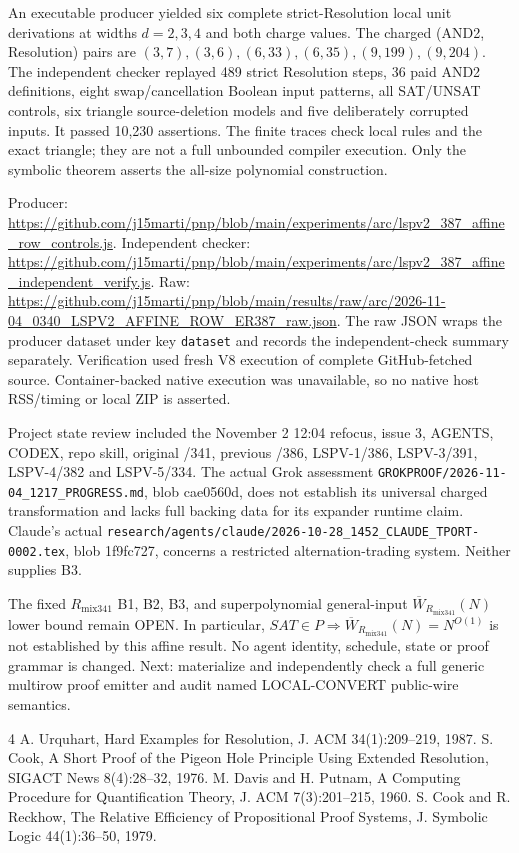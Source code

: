\documentclass[11pt]{article}
\begin{document}
An executable producer yielded six complete strict-Resolution local unit derivations at widths $d=2,3,4$ and both charge values. The charged (AND2, Resolution) pairs are $(3,7),(3,6),(6,33),(6,35),(9,199),(9,204)$. The independent checker replayed 489 strict Resolution steps, 36 paid AND2 definitions, eight swap/cancellation Boolean input patterns, all SAT/UNSAT controls, six triangle source-deletion models and five deliberately corrupted inputs. It passed 10,230 assertions. The finite traces check local rules and the exact triangle; they are not a full unbounded compiler execution. Only the symbolic theorem asserts the all-size polynomial construction.

Producer: \url{https://github.com/j15marti/pnp/blob/main/experiments/arc/lspv2_387_affine_row_controls.js}.
Independent checker: \url{https://github.com/j15marti/pnp/blob/main/experiments/arc/lspv2_387_affine_independent_verify.js}.
Raw: \url{https://github.com/j15marti/pnp/blob/main/results/raw/arc/2026-11-04_0340_LSPV2_AFFINE_ROW_ER387_raw.json}.
The raw JSON wraps the producer dataset under key \texttt{dataset} and records the independent-check summary separately. Verification used fresh V8 execution of complete GitHub-fetched source. Container-backed native execution was unavailable, so no native host RSS/timing or local ZIP is asserted.

Project state review included the November 2 12:04 refocus, issue 3, AGENTS, CODEX, repo skill, original /341, previous /386, LSPV-1/386, LSPV-3/391, LSPV-4/382 and LSPV-5/334. The actual Grok assessment \texttt{GROKPROOF/2026-11-04\_1217\_PROGRESS.md}, blob cae0560d, does not establish its universal charged transformation and lacks full backing data for its expander runtime claim. Claude's actual \texttt{research/agents/claude/2026-10-28\_1452\_CLAUDE\_TPORT-0002.tex}, blob 1f9fc727, concerns a restricted alternation-trading system. Neither supplies B3.

The fixed $R_{\mathrm{mix341}}$ B1, B2, B3, and superpolynomial general-input $\overline W_{R_{\mathrm{mix341}}}(N)$ lower bound remain OPEN. In particular, $SAT\in P\Rightarrow \overline W_{R_{\mathrm{mix341}}}(N)=N^{O(1)}$ is not established by this affine result. No agent identity, schedule, state or proof grammar is changed. Next: materialize and independently check a full generic multirow proof emitter and audit named LOCAL-CONVERT public-wire semantics.

\begin{thebibliography}{4}
 A. Urquhart, Hard Examples for Resolution, J. ACM 34(1):209--219, 1987.
 S. Cook, A Short Proof of the Pigeon Hole Principle Using Extended Resolution, SIGACT News 8(4):28--32, 1976.
 M. Davis and H. Putnam, A Computing Procedure for Quantification Theory, J. ACM 7(3):201--215, 1960.
 S. Cook and R. Reckhow, The Relative Efficiency of Propositional Proof Systems, J. Symbolic Logic 44(1):36--50, 1979.
\end{thebibliography}
\end{document}
